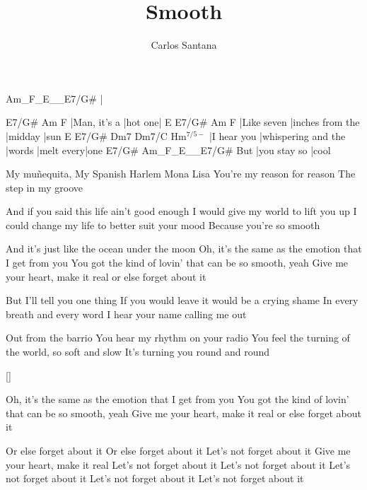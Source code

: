 \documentclass{song}
\title{Smooth}
\author{Carlos Santana}
\renewcommand{\-}{$^{7/5-}$}
\begin{document}
\strophe
Am_F_E__E7/G#
|
\endstrophe

\strophe
E7/G#        Am      F
|Man, it's a |hot one|
E           E7/G#            Am      F
|Like seven |inches from the |midday |sun
E           E7/G#               Dm7    Dm7/C      Hm\-
|I hear you |whispering and the |words |melt every|one
    E7/G#        Am_F_E__E7/G#
But |you stay so |cool
\endstrophe

\strophe*
My muñequita,
My Spanish Harlem Mona Lisa
You're my reason for reason
The step in my groove
\endstrophe

And if you said this life ain't good enough
I would give my world to lift you up
I could change my life to better suit your mood
Because you're so smooth

And it's just like the ocean under the moon
Oh, it's the same as the emotion that I get from you
You got the kind of lovin' that can be so smooth, yeah
Give me your heart, make it real or else forget about it
\endstrophe

\strophe*
But I'll tell you one thing
If you would leave it would be a crying shame
In every breath and every word
I hear your name calling me out
\endstrophe

\strophe*
Out from the barrio
You hear my rhythm on your radio
You feel the turning of the world, so soft and slow
It's turning you round and round
\endstrophe


\ref{}


Oh, it's the same as the emotion that I get from you
You got the kind of lovin' that can be so smooth, yeah
Give me your heart, make it real or else forget about it
\endstrophe

\strophe*
Or else forget about it
Or else forget about it
Let's not forget about it
Give me your heart, make it real
Let's not forget about it
Let's not forget about it
Let's not forget about it
Let's not forget about it
Let's not forget about it
\endstrophe

\end{document}

